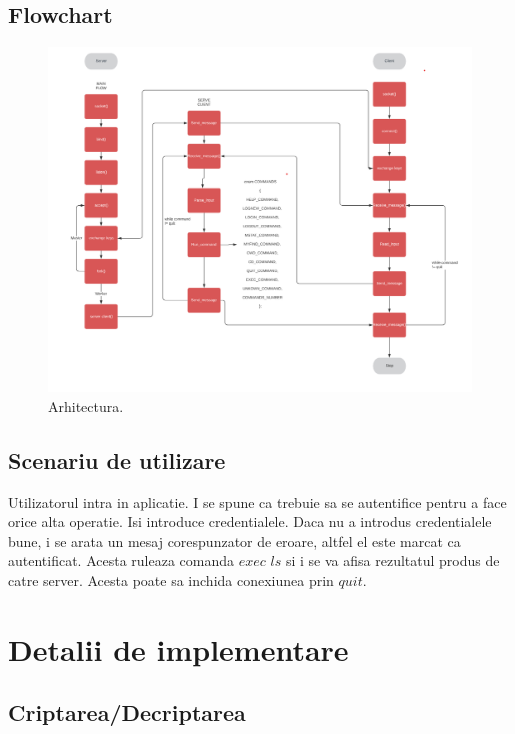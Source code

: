 \documentclass[runningheads]{llncs}
\begin{document}
\subsection{Flowchart}

\begin{figure}[H]
  \includegraphics[width=\linewidth]{flow.png}
  \caption{Arhitectura.}
  \label{fig:flow}
\end{figure}


\subsection{Scenariu de utilizare}

Utilizatorul intra in aplicatie. I se spune ca trebuie sa se autentifice pentru a face orice alta operatie. Isi introduce credentialele. Daca nu a introdus credentialele bune, i se arata un mesaj corespunzator de eroare, altfel el este marcat ca autentificat. Acesta ruleaza comanda $exec$ $ls$ si i se va afisa rezultatul produs de catre server. Acesta poate sa inchida conexiunea prin $quit$.

\section{Detalii de implementare}

\subsection{Criptarea/Decriptarea}
\end{document}
